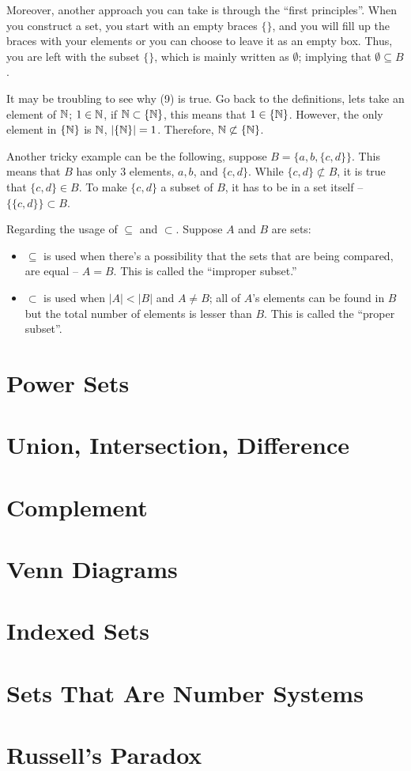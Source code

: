 \documentclass[../Latex-Setup/setup.tex]{subfiles}
\begin{document}
\indent Moreover, another approach you can take is through the ``first principles''. When you construct a set, you start with an empty braces $\{\}$,
and you will fill up the braces with your elements or you can choose to leave it as an empty box. Thus, you are left with the subset $\{\}$,
which is mainly written as $\emptyset$; implying that $\emptyset \subseteq B$.\par

\indent It may be troubling to see why (9) is true. Go back to the definitions, lets take an element of $\mathbb N$;
$1 \in \mathbb N$, if $\mathbb N \subset \{\mathbb N\}$, this means that $1 \in \{\mathbb N\}$. However, the only element in $\{\mathbb N\}$ is $\mathbb N$, $|\{\mathbb N\}| = 1$.
Therefore, $\mathbb N \not\subset \{\mathbb N\}$.\par

\indent Another tricky example can be the following, suppose $B = \{a,b,\{c,d\}\}$. This means that $B$ has only $3$ elements, $a,b$, and $\{c,d\}$.
While $\{c,d\} \not\subset B$, it is true that $\{c,d\} \in B$. To make $\{c,d\}$ a subset of $B$, it has to be in a set itself -- $\{\{c,d\}\} \subset B$.\par

\begin{remark}
    Regarding the usage of $\subseteq$ and $\subset$. Suppose $A$ and $B$ are sets:\par
    \begin{itemize}
        \item $\subseteq$ is used when there's a possibility that the sets that are being compared, are equal -- $A = B$. This is called the ``improper subset.''
        \item $\subset$ is used when $|A| < |B|$ and $A \neq B$; all of $A$'s elements can be found in $B$ but the total number of elements is lesser than $B$. This is called the ``proper subset''.
    \end{itemize}
\end{remark}


\section{Power Sets}
\section{Union, Intersection, Difference}
\section{Complement}
\section{Venn Diagrams}
\section{Indexed Sets}
\section{Sets That Are Number Systems}
\section{Russell's Paradox}
\end{document}
